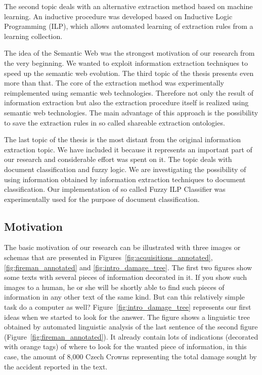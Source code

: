 \documentclass[12pt,a4paper,twoside,notitlepage]{article}
\begin{document}
The second topic deals with an alternative extraction method based on machine learning. An inductive procedure was developed based on Inductive Logic Programming (ILP), which allows automated learning of extraction rules from a learning collection.

The idea of the Semantic Web was the strongest motivation of our research from the very beginning. We wanted to exploit information extraction techniques to speed up the semantic web evolution. The third topic of the thesis presents even more than that. The core of the extraction method was experimentally reimplemented using semantic web technologies. Therefore not only the result of information extraction but also the extraction procedure itself is realized using semantic web technologies. The main advantage of this approach is the possibility to save the extraction rules in so called shareable extraction ontologies.

The last topic of the thesis is the most distant from the original information extraction topic. We have included it because it represents an important part of our research and considerable effort was spent on it. The topic deals with document classification and fuzzy logic. We are investigating the possibility of using information obtained by information extraction techniques to document classification. Our implementation of so called Fuzzy ILP Classifier was experimentally used for the purpose of document classification.

\subsection{Motivation}
The basic motivation of our research can be illustrated with three images or schemas that are presented in Figures~\ref{fig:acquisitions_annotated}, \ref{fig:fireman_annotated} and \ref{fig:intro_damage_tree}. The first two figures show some texts with several pieces of information decorated in it. If you show such images to a human, he or she will be shortly able to find such pieces of information in any other text of the same kind. But can this relatively simple task do a computer as well? Figure~\ref{fig:intro_damage_tree} represents our first ideas when we started to look for the answer. The figure shows a linguistic tree obtained by automated linguistic analysis of the last sentence of the second figure (Figure~\ref{fig:fireman_annotated}). It already contain lots of indications (decorated with orange tags) of where to look for the wanted piece of information, in this case, the amount of 8,000 Czech Crowns representing the total damage sought by the accident reported in the text.
\end{document}
